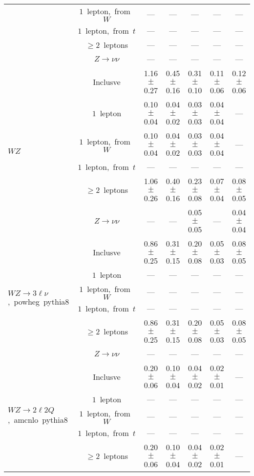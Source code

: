 \documentclass{article}
\begin{document}
\begin{longtable}{|l|c|c|c|c|c|c|}
 & $1$~lepton,~from~$W$  & ---  & ---  & ---  & ---  & --- \\* 
 & $1$~lepton,~from~$t$  & ---  & ---  & ---  & ---  & --- \\* 
 & $\ge2$~leptons  & ---  & ---  & ---  & ---  & --- \\* 
 & $Z\rightarrow\nu\nu$  & ---  & ---  & ---  & ---  & --- \\* 
\hline 
\multirow{6}{*}{$WZ$} & Inclusve  & 1.16 $\pm$ 0.27  & 0.45 $\pm$ 0.16  & 0.31 $\pm$ 0.10  & 0.11 $\pm$ 0.06  & 0.12 $\pm$ 0.06 \\* 
 & $1$~lepton  & 0.10 $\pm$ 0.04  & 0.04 $\pm$ 0.02  & 0.03 $\pm$ 0.03  & 0.04 $\pm$ 0.04  & --- \\* 
 & $1$~lepton,~from~$W$  & 0.10 $\pm$ 0.04  & 0.04 $\pm$ 0.02  & 0.03 $\pm$ 0.03  & 0.04 $\pm$ 0.04  & --- \\* 
 & $1$~lepton,~from~$t$  & ---  & ---  & ---  & ---  & --- \\* 
 & $\ge2$~leptons  & 1.06 $\pm$ 0.26  & 0.40 $\pm$ 0.16  & 0.23 $\pm$ 0.08  & 0.07 $\pm$ 0.04  & 0.08 $\pm$ 0.05 \\* 
 & $Z\rightarrow\nu\nu$  & ---  & ---  & 0.05 $\pm$ 0.05  & ---  & 0.04 $\pm$ 0.04 \\* 
\hline 
\multirow{6}{*}{$WZ{\rightarrow}3\ell\nu$,~powheg~pythia8} & Inclusve  & 0.86 $\pm$ 0.25  & 0.31 $\pm$ 0.15  & 0.20 $\pm$ 0.08  & 0.05 $\pm$ 0.03  & 0.08 $\pm$ 0.05 \\* 
 & $1$~lepton  & ---  & ---  & ---  & ---  & --- \\* 
 & $1$~lepton,~from~$W$  & ---  & ---  & ---  & ---  & --- \\* 
 & $1$~lepton,~from~$t$  & ---  & ---  & ---  & ---  & --- \\* 
 & $\ge2$~leptons  & 0.86 $\pm$ 0.25  & 0.31 $\pm$ 0.15  & 0.20 $\pm$ 0.08  & 0.05 $\pm$ 0.03  & 0.08 $\pm$ 0.05 \\* 
 & $Z\rightarrow\nu\nu$  & ---  & ---  & ---  & ---  & --- \\* 
\hline 
\multirow{6}{*}{$WZ{\rightarrow}2{\ell}2Q$,~amcnlo~pythia8} & Inclusve  & 0.20 $\pm$ 0.06  & 0.10 $\pm$ 0.04  & 0.04 $\pm$ 0.02  & 0.02 $\pm$ 0.01  & --- \\* 
 & $1$~lepton  & ---  & ---  & ---  & ---  & --- \\* 
 & $1$~lepton,~from~$W$  & ---  & ---  & ---  & ---  & --- \\* 
 & $1$~lepton,~from~$t$  & ---  & ---  & ---  & ---  & --- \\* 
 & $\ge2$~leptons  & 0.20 $\pm$ 0.06  & 0.10 $\pm$ 0.04  & 0.04 $\pm$ 0.02  & 0.02 $\pm$ 0.01  & --- \\* 

\end{longtable}
\end{document}
